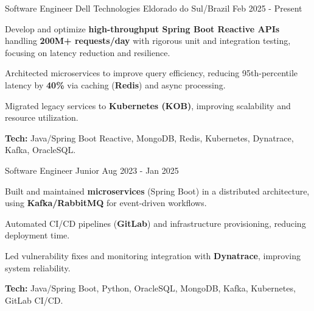 

\begin{cventries}

  \cventry
    {Software Engineer} %
    {Dell Technologies} %
    {Eldorado do Sul/Brazil} %
    {Feb 2025 - Present} %
    {
      \begin{cvitems} %
        \item {Develop and optimize \textbf{high-throughput Spring Boot Reactive APIs} handling \textbf{200M+ requests/day} with rigorous unit and integration testing, focusing on latency reduction and resilience.}
        \item {Architected microservices to improve query efficiency, reducing 95th-percentile latency by \textbf{40\%} via caching (\textbf{Redis}) and async processing.}
        \item {Migrated legacy services to \textbf{Kubernetes (KOB)}, improving scalability and resource utilization.}
        \item {\textbf{Tech:} Java/Spring Boot Reactive, MongoDB, Redis, Kubernetes, Dynatrace, Kafka, OracleSQL.}
      \end{cvitems}
    }

  \cventry
    {Software Engineer Junior} %
    {} %
    {} %
    {Aug 2023 - Jan 2025} %
    {
      \begin{cvitems} %
        \item {Built and maintained \textbf{microservices} (Spring Boot) in a distributed architecture, using \textbf{Kafka/RabbitMQ} for event-driven workflows.}
        \item {Automated CI/CD pipelines (\textbf{GitLab}) and infrastructure provisioning, reducing deployment time.}
        \item {Led vulnerability fixes and monitoring integration with \textbf{Dynatrace}, improving system reliability.}
        \item {\textbf{Tech:} Java/Spring Boot, Python, OracleSQL, MongoDB, Kafka, Kubernetes, GitLab CI/CD.}
      \end{cvitems}
    }


\end{cventries}
